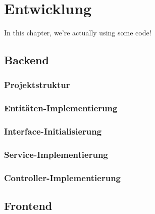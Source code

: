 \chapter{Entwicklung}\label{ch:method}

In this chapter, we're actually using some code!
\section{Backend}
\subsection{Projektstruktur}
\subsection{Entitäten-Implementierung}
\subsection{Interface-Initialisierung}
\subsection{Service-Implementierung}
\subsection{Controller-Implementierung}
\section{Frontend}

\
